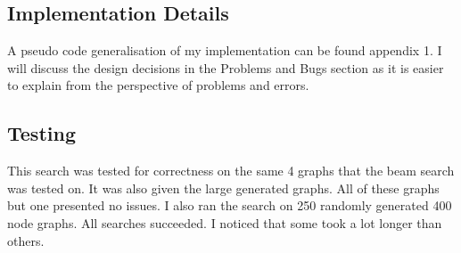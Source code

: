 \documentclass[]{article}
\begin{document}
\vspace*{0.8cm}
\subsection*{Implementation Details}
A pseudo code generalisation of my implementation can be found appendix 1.
I will discuss the design decisions in the Problems and Bugs section as it is easier to explain from the perspective of problems and errors.
\subsection*{Testing}
This search was tested for correctness on the same 4 graphs that the beam search was tested on. It was also given the large generated graphs. All of these graphs but one presented no issues. I also ran the search on 250 randomly generated 400 node graphs. All searches succeeded. I noticed that some took a lot longer than others.
\end{document}
